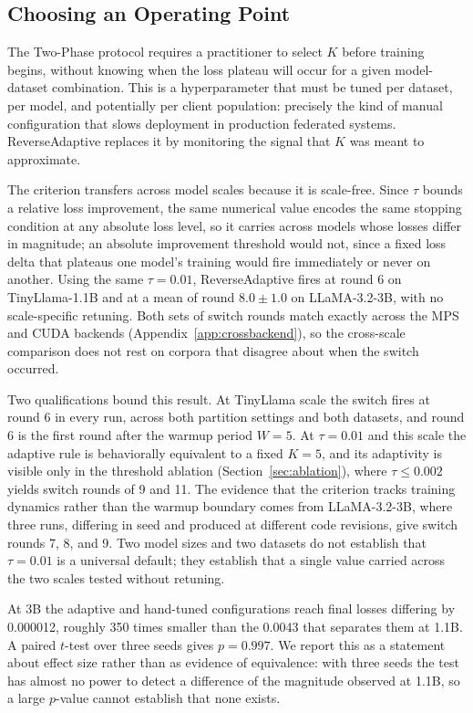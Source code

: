\subsection{Choosing an Operating Point}
The Two-Phase protocol requires a practitioner to select $K$ before training begins, without knowing when the loss plateau will occur for a given model-dataset combination. This is a hyperparameter that must be tuned per dataset, per model, and potentially per client population: precisely the kind of manual configuration that slows deployment in production federated systems. ReverseAdaptive replaces it by monitoring the signal that $K$ was meant to approximate.

The criterion transfers across model scales because it is scale-free. Since $\tau$ bounds a relative loss improvement, the same numerical value encodes the same stopping condition at any absolute loss level, so it carries across models whose losses differ in magnitude; an absolute improvement threshold would not, since a fixed loss delta that plateaus one model's training would fire immediately or never on another. Using the same $\tau{=}0.01$, ReverseAdaptive fires at round 6 on TinyLlama-1.1B and at a mean of round $8.0 \pm 1.0$ on LLaMA-3.2-3B, with no scale-specific retuning. Both sets of switch rounds match exactly across the MPS and CUDA backends (Appendix~\ref{app:crossbackend}), so the cross-scale comparison does not rest on corpora that disagree about when the switch occurred.

Two qualifications bound this result. At TinyLlama scale the switch fires at round 6 in every run, across both partition settings and both datasets, and round 6 is the first round after the warmup period $W{=}5$. At $\tau{=}0.01$ and this scale the adaptive rule is behaviorally equivalent to a fixed $K{=}5$, and its adaptivity is visible only in the threshold ablation (Section~\ref{sec:ablation}), where $\tau \leq 0.002$ yields switch rounds of 9 and 11. The evidence that the criterion tracks training dynamics rather than the warmup boundary comes from LLaMA-3.2-3B, where three runs, differing in seed and produced at different code revisions, give switch rounds 7, 8, and 9. Two model sizes and two datasets do not establish that $\tau{=}0.01$ is a universal default; they establish that a single value carried across the two scales tested without retuning.

At 3B the adaptive and hand-tuned configurations reach final losses differing by 0.000012, roughly 350 times smaller than the 0.0043 that separates them at 1.1B. A paired $t$-test over three seeds gives $p = 0.997$. We report this as a statement about effect size rather than as evidence of equivalence: with three seeds the test has almost no power to detect a difference of the magnitude observed at 1.1B, so a large $p$-value cannot establish that none exists.

